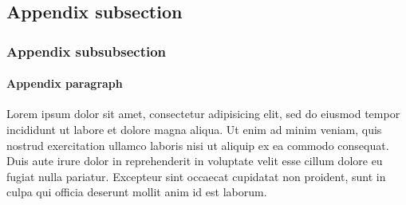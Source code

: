 \documentclass{melba}
\begin{document}
	\subsection{Appendix subsection}
		\subsubsection{Appendix subsubsection}
			\paragraph{Appendix paragraph} Lorem ipsum dolor sit amet, consectetur adipisicing elit, sed do eiusmod
			tempor incididunt ut labore et dolore magna aliqua. Ut enim ad minim veniam,
			quis nostrud exercitation ullamco laboris nisi ut aliquip ex ea commodo
			consequat. Duis aute irure dolor in reprehenderit in voluptate velit esse
			cillum dolore eu fugiat nulla pariatur. Excepteur sint occaecat cupidatat non
			proident, sunt in culpa qui officia deserunt mollit anim id est laborum.
\end{document}
